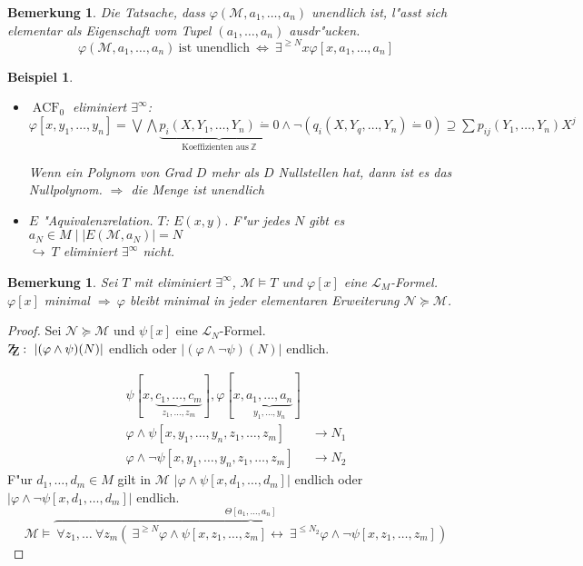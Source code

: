 \documentclass[a4paper,12pt,numbers=noenddot,parskip=full]{scrartcl}
\newcommand{\setZ}{\mathbb{Z}}
\newcommand{\Forall}{~\forall}
\newcommand{\Exists}{~\exists}
\newcommand{\scrL}{\mathcal{L}}
\newcommand{\scrM}{\mathcal{M}}
\newcommand{\scrN}{\mathcal{N}}
\newcommand{\zz}{\mathrm{Z\kern-.3em\raise-0.5ex\hbox{Z}}:~}
\DeclareMathOperator{\acf}{ACF}
\theoremstyle{dotless}
\newtheorem{example}[theorem]{Beispiel}
\newtheorem{remark}[theorem]{Bemerkung}
\begin{document}
\begin{remark}
	Die Tatsache, dass $\varphi(\scrM, a_1, \dots, a_n)$ unendlich ist, l"asst sich elementar als Eigenschaft vom Tupel $(a_1, \dots, a_n)$ ausdr"ucken.
	\begin{equation*}
		\varphi(\scrM, a_1, \dots, a_n)~\text{ist unendlich}~ \Longleftrightarrow~ \exists^{\geq N} x \varphi[x, a_1, \dots, a_n]
	\end{equation*}
\end{remark}
\begin{example}
	\begin{itemize}
		\item $\acf_0$ eliminiert $\exists^\infty$:\\
		$\varphi[x,y_1, \dots, y_n] = \bigvee \bigwedge \underbrace{p_i (X, Y_1, \dots, Y_n)\dot= 0}_{\text{Koeffizienten aus}~ \setZ} \land \lnot (q_i(X,Y_q, \dots, Y_n)\dot= 0) \supseteq \sum p_{ij} (Y_1, \dots,Y_n)X^j$
		
		Wenn ein Polynom von Grad $D$ mehr als $D$ Nullstellen hat, dann ist es das Nullpolynom. $\Rightarrow$ die Menge ist unendlich
		\item $E$ "Aquivalenzrelation. $T$: %
		$E(x,y)$. F"ur jedes $N$ gibt es $a_N \in M \mid |E(\scrM, a_N)| = N$\\
		$\hookrightarrow~ T$ eliminiert $\exists^\infty$ nicht.
	\end{itemize}
\end{example}
\begin{remark}
	Sei $T$ mit eliminiert $\exists^\infty$, $\scrM \models T$ und $\varphi[x]$ eine $\scrL_M$-Formel. $\varphi[x]$ \emph{minimal} $\Rightarrow~ \varphi$ bleibt minimal in jeder elementaren Erweiterung $\scrN \succeq \scrM$.
\end{remark}
\begin{proof}
	Sei $\scrN \succeq \scrM$ und $\psi[x]$ eine $\scrL_N$-Formel.\\
	$\zz |(\varphi \land \psi)(N)|$ endlich oder $|(\varphi \land \lnot \psi)(N)|$ endlich.
	
	\begin{align*}
		\psi[x,\underbrace{c_1, \dots, c_m}_{z_1, \dots, z_m}], \varphi[x, \underbrace{a_1, \dots, a_n}_{y_1, \dots, y_n}]\\
		\varphi\land \psi[x, y_1, \dots, y_n, z_1, \dots, z_m] &\longrightarrow N_1\\
		\varphi\land \lnot \psi[x, y_1, \dots, y_n, z_1, \dots, z_m] &\longrightarrow N_2
	\end{align*}
	F"ur $d_1, \dots, d_m \in M$ gilt in $\scrM$ $|\varphi\land \psi[x, d_1, \dots, d_m]|$ endlich oder $|\varphi \land \lnot \psi[x, d_1, \dots, d_m]|$ endlich.
	\begin{equation*}
		\scrM \models \overbrace{\Forall z_1, \dots \Forall z_m(\Exists^{\geq N} \varphi \land \psi[x, z_1, \dots, z_m] \leftrightarrow  \Exists^{\leq N_2} \varphi \land \lnot \psi [x, z_1, \dots, z_m])}^{\Theta[a_1,\dots, a_n]}
	\end{equation*}
\end{proof}
\end{document}
